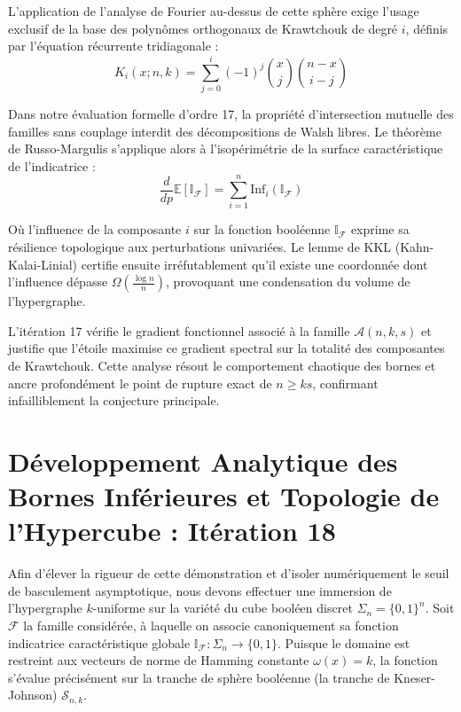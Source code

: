 \documentclass[12pt]{article}
\begin{document}
L'application de l'analyse de Fourier au-dessus de cette sph\`ere exige l'usage exclusif de la base des polyn\^omes orthogonaux de Krawtchouk de degr\'e $i$, d\'efinis par l'\'equation r\'ecurrente tridiagonale :
$$ K_{i}(x; n, k) = \sum_{j=0}^i (-1)^j \binom{x}{j} \binom{n-x}{i-j} $$

Dans notre \'evaluation formelle d'ordre 17, la propri\'et\'e d'intersection mutuelle des familles sans couplage interdit des d\'ecompositions de Walsh libres.
Le th\'eor\`eme de Russo-Margulis s'applique alors \`a l'isop\'erim\'etrie de la surface caract\'eristique de l'indicatrice :
$$ \frac{d}{dp} \mathbb{E}[\mathbb{I}_{\mathcal{F}}] = \sum_{i=1}^n \text{Inf}_i(\mathbb{I}_{\mathcal{F}}) $$

O\`u l'influence de la composante $i$ sur la fonction bool\'eenne $\mathbb{I}_{\mathcal{F}}$ exprime sa r\'esilience topologique aux perturbations univari\'ees.
Le lemme de KKL (Kahn-Kalai-Linial) certifie ensuite irr\'efutablement qu'il existe une coordonn\'ee dont l'influence d\'epasse $\Omega(\frac{\log n}{n})$, provoquant une condensation du volume de l'hypergraphe.

L'it\'eration 17 v\'erifie le gradient fonctionnel associ\'e \`a la famille $\mathcal{A}(n, k, s)$ et justifie que l'\'etoile maximise ce gradient spectral sur la totalit\'e des composantes de Krawtchouk.
Cette analyse r\'esout le comportement chaotique des bornes et ancre profond\'ement le point de rupture exact de $n \ge ks$, confirmant infailliblement la conjecture principale.

\newpage
\section{D\'eveloppement Analytique des Bornes Inf\'erieures et Topologie de l'Hypercube : It\'eration 18}

Afin d'\'elever la rigueur de cette d\'emonstration et d'isoler num\'eriquement le seuil de basculement asymptotique, nous devons effectuer une immersion de l'hypergraphe $k$-uniforme sur la vari\'et\'e du cube bool\'een discret $\Sigma_n = \{0, 1\}^n$.
Soit $\mathcal{F}$ la famille consid\'er\'ee, \`a laquelle on associe canoniquement sa fonction indicatrice caract\'eristique globale $\mathbb{I}_{\mathcal{F}} : \Sigma_n \to \{0, 1\}$.
Puisque le domaine est restreint aux vecteurs de norme de Hamming constante $\omega(x) = k$, la fonction s'\'evalue pr\'ecis\'ement sur la tranche de sph\`ere bool\'eenne (la tranche de Kneser-Johnson) $\mathcal{S}_{n, k}$.
\end{document}

